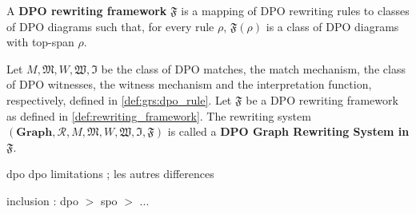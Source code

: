     \begin{definition}
        A \textbf{DPO rewriting framework} $\mathfrak{F}$ is a mapping of DPO rewriting rules to classes of DPO diagrams such that, for every rule $\rho$, $\mathfrak{F}(\rho)$ is a class of DPO diagrams with top-span $\rho$.
      \end{definition}
    

    \begin{definition}
      Let $M, \mathfrak{M}, W, \mathfrak{W}, \mathfrak{I}$ be the class of DPO matches, the match mechanism, the class of DPO witnesses, the witness mechanism and the interpretation function, respectively, defined in \autoref{def:grs:dpo_rule}.
      Let $\mathfrak{F}$ be a DPO rewriting framework as defined in \autoref{def:rewriting_framework}.
      The rewriting system $(\mathbf{Graph}, \mathcal{R}, M, \mathfrak{M}, W, \mathfrak{W}, \mathfrak{I}, \mathfrak{F})$ is called a \textbf{DPO Graph Rewriting System in $\mathfrak{F}$}.
    \end{definition}


    \color{red}    
    
    
    dpo
    dpo limitations ;
    les autres differences
    
    \begin{proposition}[to do]
        inclusion : dpo $>$ spo $>$ ...
    \end{proposition}
    
